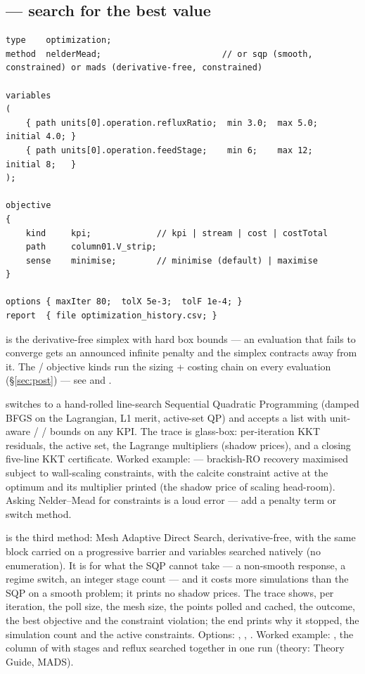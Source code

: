 \documentclass[11pt,a4paper]{article}
\begin{document}
\subsection{ --- search for the best value}

\begin{lstlisting}[language=dict]
type    optimization;
method  nelderMead;                        // or sqp (smooth, constrained) or mads (derivative-free, constrained)

variables
(
    { path units[0].operation.refluxRatio;  min 3.0;  max 5.0;  initial 4.0; }
    { path units[0].operation.feedStage;    min 6;    max 12;   initial 8;   }
);

objective
{
    kind     kpi;             // kpi | stream | cost | costTotal
    path     column01.V_strip;
    sense    minimise;        // minimise (default) | maximise
}

options { maxIter 80;  tolX 5e-3;  tolF 1e-4; }
report  { file optimization_history.csv; }
\end{lstlisting}

 is the derivative-free simplex with hard box bounds
--- an evaluation that fails to converge gets an announced infinite
penalty and the simplex contracts away from it.  The  /
 objective kinds run the  sizing +
costing chain on every evaluation (\S\ref{sec:post}) --- see
 and .

 switches to a hand-rolled line-search Sequential
Quadratic Programming (damped BFGS on the Lagrangian, L1 merit,
active-set QP) and accepts a  list with
unit-aware  /  /  bounds on any
KPI.  The trace is glass-box: per-iteration KKT residuals, the active
set, the Lagrange multipliers (shadow prices), and a closing five-line
KKT certificate.  Worked example:
 --- brackish-RO recovery
maximised subject to wall-scaling constraints, with the calcite
constraint active at the optimum and its multiplier printed (the
shadow price of scaling head-room).  Asking Nelder--Mead for
constraints is a loud error --- add a penalty term or switch method.

 is the third method: Mesh Adaptive Direct Search, derivative-free, with the
same  block carried on a progressive barrier and 
variables searched natively (no enumeration).  It is for what the SQP cannot take --- a
non-smooth response, a regime switch, an integer stage count --- and it costs more simulations
than the SQP on a smooth problem; it prints no shadow prices.  The trace shows, per
iteration, the poll size, the mesh size, the points polled and cached, the outcome, the best
objective and the constraint violation; the end prints why it stopped, the simulation count and
the active constraints.  Options: , , .  Worked
example: , the column of  with
stages and reflux searched together in one run (theory: Theory Guide, MADS).
\end{document}
